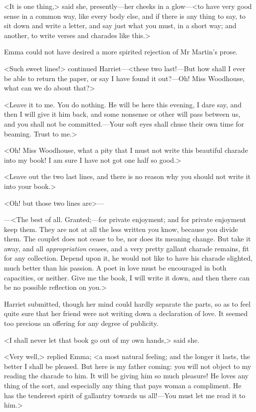 <It is one thing,> said she, presently—her cheeks in a glow—<to have very good sense in a common way, like every body else, and if there is any thing to say, to sit down and write a letter, and say just what you must, in a short way; and another, to write verses and charades like this.>

Emma could not have desired a more spirited rejection of Mr Martin's prose.

<Such sweet lines!> continued Harriet—<these two last!—But how shall I ever be able to return the paper, or say I have found it out?—Oh! Miss Woodhouse, what can we do about that?>

<Leave it to me. You do nothing. He will be here this evening, I dare say, and then I will give it him back, and some nonsense or other will pass between us, and you shall not be committed.—Your soft eyes shall chuse their own time for beaming. Trust to me.>

<Oh! Miss Woodhouse, what a pity that I must not write this beautiful charade into my book! I am sure I have not got one half so good.>

<Leave out the two last lines, and there is no reason why you should not write it into your book.>

<Oh! but those two lines are>—

—<The best of all. Granted;—for private enjoyment; and for private enjoyment keep them. They are not at all the less written you know, because you divide them. The couplet does not cease to be, nor does its meaning change. But take it away, and all \textit{appropriation} ceases, and a very pretty gallant charade remains, fit for any collection. Depend upon it, he would not like to have his charade slighted, much better than his passion. A poet in love must be encouraged in both capacities, or neither. Give me the book, I will write it down, and then there can be no possible reflection on you.>

Harriet submitted, though her mind could hardly separate the parts, so as to feel quite sure that her friend were not writing down a declaration of love. It seemed too precious an offering for any degree of publicity.

<I shall never let that book go out of my own hands,> said she.

<Very well,> replied Emma; <a most natural feeling; and the longer it lasts, the better I shall be pleased. But here is my father coming: you will not object to my reading the charade to him. It will be giving him so much pleasure! He loves any thing of the sort, and especially any thing that pays woman a compliment. He has the tenderest spirit of gallantry towards us all!—You must let me read it to him.>

